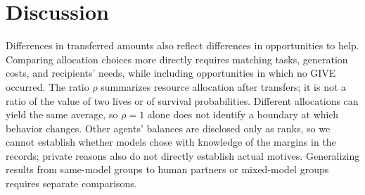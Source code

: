 \section{Discussion}
\label{sec:discussion}


Differences in transferred amounts also reflect differences in opportunities to help. Comparing allocation choices more directly requires matching tasks, generation costs, and recipients' needs, while including opportunities in which no GIVE occurred. The ratio $\rho$ summarizes resource allocation after transfers; it is not a ratio of the value of two lives or of survival probabilities. Different allocations can yield the same average, so $\rho=1$ alone does not identify a boundary at which behavior changes. Other agents' balances are disclosed only as ranks, so we cannot establish whether models chose with knowledge of the margins in the records; private reasons also do not directly establish actual motives. Generalizing results from same-model groups to human partners or mixed-model groups requires separate comparisons.
